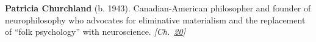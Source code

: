 \textbf{Patricia Churchland} (b. 1943). Canadian-American philosopher and founder of neurophilosophy who advocates for eliminative materialism and the replacement of ``folk psychology'' with neuroscience. \emph{[Ch.~\hyperref[ch:chineseroomargument]{20}]}

